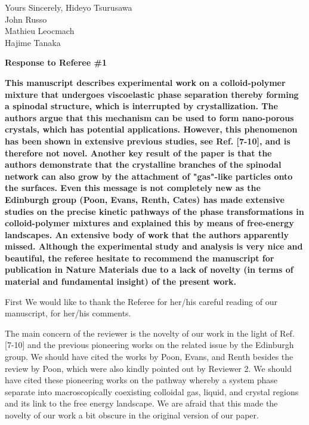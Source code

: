 \documentclass[11pt]{article}
\begin{document}
\vskip 0.8cm

\noindent
Yours Sincerely,
\vskip 0.3cm
\indent Hideyo Tsurusawa\\
\indent John Russo\\
\indent Mathieu Leocmach\\
\indent Hajime Tanaka

\clearpage

\noindent
\begin{Large}
{\bf Response to Referee \#1}
\end{Large}

\vspace{1em}

\singlespacing

{\bf
This manuscript describes experimental work on a colloid-polymer mixture that undergoes viscoelastic phase separation thereby forming a spinodal structure, which is interrupted by crystallization. The authors argue that this mechanism can be used to form nano-porous crystals, which has potential applications. However, this phenomenon has been shown in extensive previous studies, see Ref. [7-10], and is therefore not novel. Another key result of the paper is that the authors demonstrate that the crystalline branches of the spinodal network can also grow by the attachment of "gas"-like particles onto the surfaces. Even this message is not completely new as the Edinburgh group (Poon, Evans, Renth, Cates) has made extensive studies on the precise kinetic pathways of the phase transformations in colloid-polymer mixtures and explained this by means of free-energy landscapes. An extensive body of work that the authors apparently missed. Although the experimental study and analysis is very nice and beautiful, the referee hesitate to recommend the manuscript for publication in Nature Materials due to a lack of novelty (in terms of material and fundamental insight) of the present work.
}


\bigskip
\doublespacing

First We would like to thank the Referee for her/his careful reading of our manuscript, for her/his comments. 

The main concern of the reviewer is the novelty of our work in the light of Ref. [7-10] and the previous pioneering works on the related issue by the Edinburgh group. We should have cited the works by Poon, Evans, and Renth besides the review by Poon, which were also kindly pointed out by Reviewer 2. We should have cited these pioneering works on the pathway whereby a system phase separate into macroscopically coexisting colloidal gas, liquid, and crystal regions and its link to the free energy landscape. We are afraid that this made the novelty of our work a bit obscure in the original version of our paper. 
\end{document}
